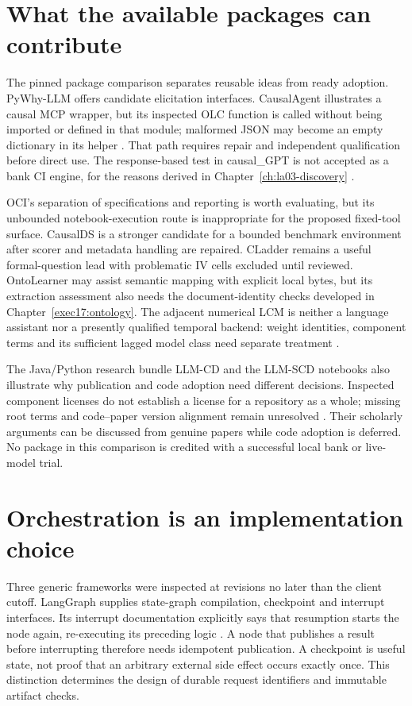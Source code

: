 \section{What the available packages can contribute}

The pinned package comparison separates reusable ideas from ready adoption.
PyWhy-LLM offers candidate elicitation interfaces. CausalAgent illustrates a
causal MCP wrapper, but its inspected OLC function is called without being
imported or defined in that module; malformed JSON may become an empty
dictionary in its helper \cite{v12_la_package_causalagent}. That path requires
repair and independent qualification before direct use. The response-based
test in causal\_GPT is not accepted as a bank CI engine, for the reasons derived
in Chapter~\ref{ch:la03-discovery} \cite{v12_la_package_causal_gpt}.

OCI's separation of specifications and reporting is worth evaluating, but its
unbounded notebook-execution route is inappropriate for the proposed fixed-tool
surface. CausalDS is a stronger candidate for a bounded benchmark environment
after scorer and metadata handling are repaired. CLadder remains a useful
formal-question lead with problematic IV cells excluded until reviewed.
OntoLearner may assist semantic mapping with explicit local bytes, but its
extraction assessment also needs the document-identity checks developed in
Chapter~\ref{exec17:ontology}. The adjacent
numerical LCM is neither a language assistant nor a presently qualified temporal
backend: weight identities, component terms and its sufficient lagged model
class need separate treatment \cite{v12_la_package_lcm}.

The Java/Python research bundle LLM-CD and the LLM-SCD notebooks also illustrate
why publication and code adoption need different decisions. Inspected component
licenses do not establish a license for a repository as a whole; missing
root terms and code--paper version alignment remain unresolved
\cite{v12_la_package_llm_cd,v12_la_package_llm_scd}. Their scholarly arguments can
be discussed from genuine papers while code adoption is deferred. No package
in this comparison is credited with a successful local bank or live-model trial.

\section{Orchestration is an implementation choice}

Three generic frameworks were inspected at revisions no later than the client
cutoff. LangGraph supplies state-graph compilation, checkpoint and interrupt
interfaces. Its interrupt documentation explicitly says that resumption starts
the node again, re-executing its preceding logic \cite{v12_la04_langgraph}. A node
that publishes a result before interrupting therefore needs idempotent
publication. A checkpoint is useful state, not proof that an arbitrary external
side effect occurs exactly once. This distinction determines the design of
durable request identifiers and immutable artifact checks.

